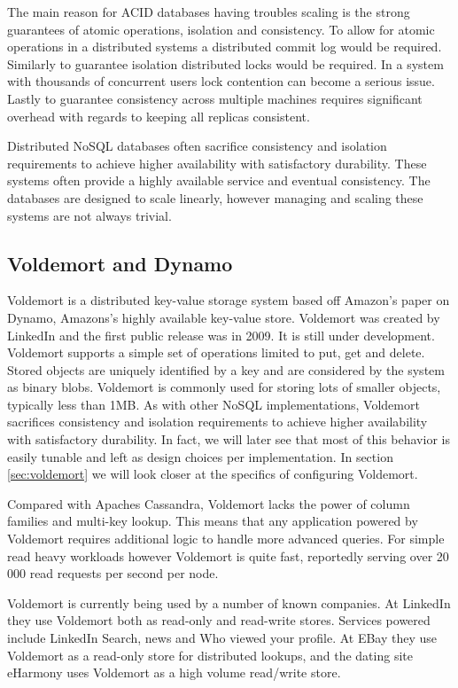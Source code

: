 The main reason for ACID databases having troubles scaling is the strong guarantees of atomic operations, isolation and consistency. 
To allow for atomic operations in a distributed systems a distributed commit log would be required. 
Similarly to guarantee isolation distributed locks would be required. In a system with thousands of concurrent users lock contention can become a serious issue. 
Lastly to guarantee consistency across multiple machines requires significant overhead with regards to keeping all replicas consistent. 

Distributed NoSQL databases often sacrifice consistency and isolation requirements to achieve higher availability with satisfactory durability. These systems often provide a highly available service and eventual consistency.
The databases are designed to scale linearly, however managing and scaling these systems are not always trivial\cite{tellybug}. 


\subsection{Voldemort and Dynamo}
Voldemort is a distributed key-value storage system based off Amazon's paper on Dynamo, Amazons's highly available key-value store. Voldemort was created by LinkedIn and the first public release was in 2009. It is still under development. Voldemort supports a simple set of operations limited to put, get and delete. Stored objects are uniquely identified by a key and are considered by the system as binary blobs. Voldemort is commonly used for storing lots of smaller objects, typically less than 1MB.  As with other NoSQL implementations, Voldemort sacrifices consistency and isolation requirements to achieve higher availability with satisfactory durability. In fact, we will later see that most of this behavior is easily tunable and left as design choices per implementation. In section \ref{sec:voldemort} we will look closer at the specifics of configuring Voldemort. 

Compared with Apaches Cassandra, Voldemort lacks the power of column families and multi-key lookup. This means that any application powered by Voldemort requires additional logic to handle more advanced queries. For simple read heavy workloads however Voldemort is quite fast, reportedly serving over 20 000 read requests per second per node\cite{voldemort}. 

Voldemort is currently being used by a number of known companies. At LinkedIn they use Voldemort both as read-only and read-write stores. Services powered include LinkedIn Search, news and Who viewed your profile. At EBay they use Voldemort as a read-only store for distributed lookups, and the dating site eHarmony uses Voldemort as a high volume read/write store.


